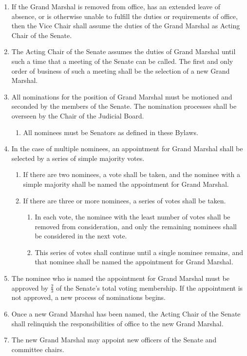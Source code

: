 \documentclass{bylaws}
\begin{document}
\begin{enumerate}
\item If the Grand Marshal is removed from office, has an extended leave of absence, or is otherwise unable to fulfill the duties or
requirements of office, then the Vice Chair shall assume the duties of the Grand Marshal as Acting Chair of the Senate.
\item The Acting Chair of the Senate assumes the duties of Grand Marshal until such a time that a meeting of the Senate can be
called. The first and only order of business of such a meeting shall be the selection of a new Grand Marshal.
\item All nominations for the position of Grand Marshal must be motioned and seconded by the members of the Senate. The
nomination processes shall be overseen by the Chair of the Judicial Board.
\begin{enumerate}
\item All nominees must be Senators as defined in these Bylaws.
\end{enumerate}
\item In the case of multiple nominees, an appointment for Grand Marshal shall be selected by a series of simple majority votes.
\begin{enumerate}
\item If there are two nominees, a vote shall be taken, and the nominee with a simple majority shall be named the appointment
for Grand Marshal.
\item If there are three or more nominees, a series of votes shall be taken. 
\begin{enumerate}
\item In each vote, the nominee with the least number of votes shall be removed from consideration, and only the remaining
nominees shall be considered in the next vote.
\item This series of votes shall continue until a single nominee remains, and that nominee shall be named the appointment for
Grand Marshal.
\end{enumerate}
\end{enumerate}

\item The nominee who is named the appointment for Grand Marshal must be approved by $\frac{2}{3}$ of the Senate’s total voting
membership. If the appointment is not approved, a new process of nominations begins.
\item Once a new Grand Marshal has been named, the Acting Chair of the Senate shall relinquish the responsibilities of office to the
new Grand Marshal.
\item The new Grand Marshal may appoint new officers of the Senate and committee chairs.

\end{enumerate}
\end{document}
